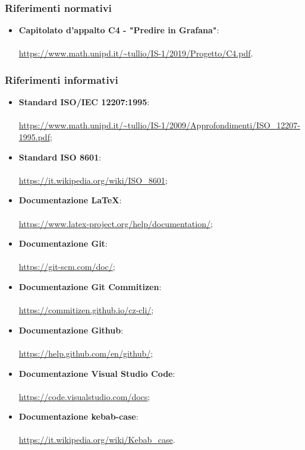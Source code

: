 \documentclass[../norme-di-progetto.tex]{subfiles}
\begin{document}
\subsubsection{Riferimenti normativi}
\begin{itemize}
  \item \textbf{Capitolato d'appalto C4 - "Predire in Grafana"}: \\ \\ \href{https://www.math.unipd.it/~tullio/IS-1/2019/Progetto/C4.pdf}{https://www.math.unipd.it/\textasciitilde tullio/IS-1/2019/Progetto/C4.pdf}.
\end{itemize}

\subsubsection{Riferimenti informativi}
\begin{itemize}
  \item \textbf{Standard ISO/IEC 12207:1995}: \\ \\ \href{https://www.math.unipd.it/~tullio/IS-1/2009/Approfondimenti/ISO_12207-1995.pdf}{https://www.math.unipd.it/\textasciitilde tullio/IS-1/2009/Approfondimenti/ISO\_12207-1995.pdf};
  \item \textbf{Standard ISO 8601}: \\ \\ \href{https://it.wikipedia.org/wiki/ISO_8601}{https://it.wikipedia.org/wiki/ISO\_8601};
\item \textbf{Documentazione \LaTeX}: \\ \\ \href{https://www.latex-project.org/help/documentation/}{https://www.latex-project.org/help/documentation/};
\item \textbf{Documentazione Git}: \\ \\ \href{https://git-scm.com/doc/}{https://git-scm.com/doc/};
\item \textbf{Documentazione Git Commitizen}: \\ \\ \href{https://commitizen.github.io/cz-cli/}{https://commitizen.github.io/cz-cli/};
\item \textbf{Documentazione Github}: \\ \\ \href{https://help.github.com/en/github/}{https://help.github.com/en/github/};
\item \textbf{Documentazione Visual Studio Code}: \\ \\ \href{https://code.visualstudio.com/docs}{https://code.visualstudio.com/docs};
\item \textbf{Documentazione kebab-case}: \\ \\ \href{https://it.wikipedia.org/wiki/Kebab_case}{https://it.wikipedia.org/wiki/Kebab\_case}.
\end{itemize}
\end{document}
